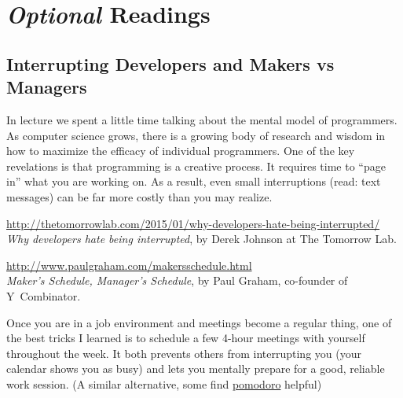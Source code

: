 \documentclass{article}
\begin{document}


\section*{\emph{Optional} Readings}

{\small

\subsection*{Interrupting Developers and Makers vs Managers}
In lecture we spent a little time talking about the mental model of
programmers. As computer science grows, there is a growing body of research
and wisdom in how to maximize the efficacy of individual programmers.
One of the key revelations is that programming is a creative process. It
requires time to ``page in'' what you are working on. As a result, even small
interruptions (read: text messages) can be far more costly than you may
realize.

\medskip
\noindent
\url{http://thetomorrowlab.com/2015/01/why-developers-hate-being-interrupted/}\\
\emph{Why developers hate being interrupted}, by Derek Johnson at The Tomorrow Lab.

\noindent
\url{http://www.paulgraham.com/makersschedule.html}\\
\emph{Maker's Schedule, Manager's Schedule}, by Paul Graham, co-founder of Y~Combinator.

\medskip
\noindent
Once you are in a job environment and meetings become a regular thing, one of
the best tricks I learned is to schedule a few 4-hour meetings with yourself
throughout the week. It both prevents others from interrupting you (your
calendar shows you as busy) and lets you mentally prepare for a good, reliable
work session.
(A similar alternative, some find
\href{http://lifehacker.com/productivity-101-a-primer-to-the-pomodoro-technique-1598992730}{pomodoro}
helpful)


}
\end{document}
